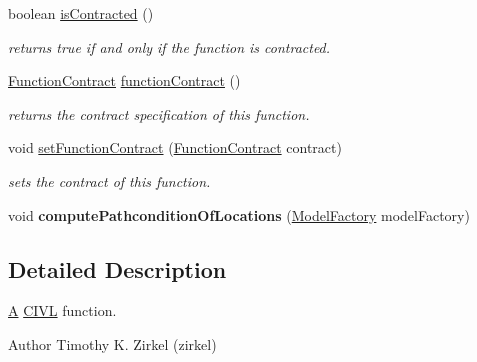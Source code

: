 \begin{DoxyCompactItemize}
boolean \hyperlink{interfaceedu_1_1udel_1_1cis_1_1vsl_1_1civl_1_1model_1_1IF_1_1CIVLFunction_aa8b4e440b90d53b19d6b46c0f8343a2b}{is\+Contracted} ()
\begin{DoxyCompactList}\small\item\em returns true if and only if the function is contracted. \end{DoxyCompactList}\item 
\hyperlink{interfaceedu_1_1udel_1_1cis_1_1vsl_1_1civl_1_1model_1_1IF_1_1contract_1_1FunctionContract}{Function\+Contract} \hyperlink{interfaceedu_1_1udel_1_1cis_1_1vsl_1_1civl_1_1model_1_1IF_1_1CIVLFunction_a09a2780b769eb3bb6980231e98d39536}{function\+Contract} ()
\begin{DoxyCompactList}\small\item\em returns the contract specification of this function. \end{DoxyCompactList}\item 
void \hyperlink{interfaceedu_1_1udel_1_1cis_1_1vsl_1_1civl_1_1model_1_1IF_1_1CIVLFunction_a511a215699c98b6caac4926d64068019}{set\+Function\+Contract} (\hyperlink{interfaceedu_1_1udel_1_1cis_1_1vsl_1_1civl_1_1model_1_1IF_1_1contract_1_1FunctionContract}{Function\+Contract} contract)
\begin{DoxyCompactList}\small\item\em sets the contract of this function. \end{DoxyCompactList}\item 
\hypertarget{interfaceedu_1_1udel_1_1cis_1_1vsl_1_1civl_1_1model_1_1IF_1_1CIVLFunction_ab307f64956a7abfa61d5a22e10cc942e}{}void {\bfseries compute\+Pathcondition\+Of\+Locations} (\hyperlink{interfaceedu_1_1udel_1_1cis_1_1vsl_1_1civl_1_1model_1_1IF_1_1ModelFactory}{Model\+Factory} model\+Factory)\label{interfaceedu_1_1udel_1_1cis_1_1vsl_1_1civl_1_1model_1_1IF_1_1CIVLFunction_ab307f64956a7abfa61d5a22e10cc942e}

\end{DoxyCompactItemize}


\subsection{Detailed Description}
\hyperlink{structA}{A} \hyperlink{classedu_1_1udel_1_1cis_1_1vsl_1_1civl_1_1CIVL}{C\+I\+V\+L} function. 

\begin{DoxyAuthor}{Author}
Timothy K. Zirkel (zirkel) 
\end{DoxyAuthor}


